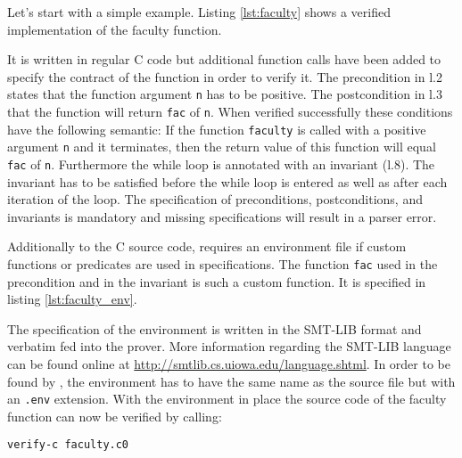 \documentclass[12pt]{article}
\begin{document}
Let's start with a simple example. Listing \ref{lst:faculty} shows a verified implementation of the faculty function.

\begin{minipage}{\linewidth}

\end{minipage}

It is written in regular C code but additional function calls have been added to specify the contract of the function in order to verify it. 
The precondition in l.2 states that the function argument \texttt{n} has to be positive. 
The postcondition in l.3 that the function will return \texttt{fac} of \texttt{n}.
When verified successfully these conditions have the following semantic: 
If the function \texttt{faculty} is called with a positive argument \texttt{n} and it terminates, then the return value of this function will equal \texttt{fac} of \texttt{n}.
Furthermore the while loop is annotated with an invariant (l.8).
The invariant has to be satisfied before the while loop is entered as well as after each iteration of the loop.
The specification of preconditions, postconditions, and invariants is mandatory and missing specifications will result in a parser error.

Additionally to the C source code, \verifyc requires an environment file if custom functions or predicates are used in specifications. 
The function \texttt{fac} used in the precondition and in the invariant is such a custom function.
It is specified in listing \ref{lst:faculty_env}.

\begin{minipage}{\linewidth}

\end{minipage}

The specification of the environment is written in the SMT-LIB format and verbatim fed into the \zthree prover.
More information regarding the SMT-LIB language can be found online at \url{http://smtlib.cs.uiowa.edu/language.shtml}. In order to be found by \verifyc, the environment has to have the same name as the source file but with an \texttt{.env} extension.
With the environment in place the source code of the faculty function can now be verified by calling:

\begin{lstlisting}[language=bash]
verify-c faculty.c0
\end{lstlisting}
\end{document}
